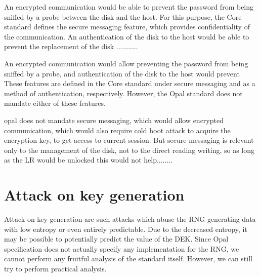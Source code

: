 An encrypted communication would be able to prevent the password from being sniffed by a probe between the disk and the host. For this purpose, the Core standard defines the secure messaging feature, which provides confidentiality of the communication.
An authentication of the disk to the host would be able to prevent the replacement of the disk ...........



An encrypted communication would allow preventing the password from being sniffed by a probe, and authentication of the disk to the host would prevent 
These features are defined in the Core standard under secure messaging and as a method of authentication, respectively. However, the Opal standard does not mandate either of these features.


opal does not mandate secure messaging, which would allow encrypted communication, which would also require cold boot attack to acquire the encryption key, to get access to current session. But secure messaging is relevant only to the management of the disk, not to the direct reading writing, so as long as the LR would be unlocked this would not help........






\section{Attack on key generation}
\label{attack_rng}

Attack on key generation are such attacks which abuse the RNG generating data with low entropy or even entirely predictable. Due to the decreased entropy, it may be possible to potentially predict the value of the DEK.
Since Opal specification does not actually specify any implementation for the RNG, we cannot perform any fruitful analysis of the standard itself. However, we can still try to perform practical analysis.

